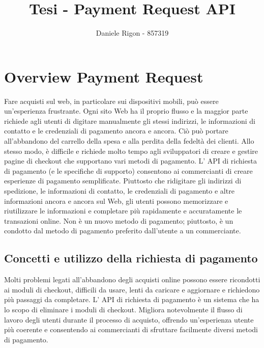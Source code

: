 \documentclass[italian]{article}
\author{
	Daniele Rigon - 857319 \\
}
\begin{document}
	
	\title{Tesi - Payment Request API}
	\maketitle
	
	\tableofcontents
	\pagebreak
	
	\section{Overview Payment Request}
	Fare acquisti sul web, in particolare sui dispositivi mobili, può essere un'esperienza frustrante. Ogni sito Web ha il proprio flusso e la maggior parte richiede agli utenti di digitare manualmente gli stessi indirizzi, le informazioni di contatto e le credenziali di pagamento ancora e ancora. Ciò può portare all'abbandono del carrello della spesa e alla perdita della fedeltà dei clienti. Allo stesso modo, è difficile e richiede molto tempo agli sviluppatori di creare e gestire pagine di checkout che supportano vari metodi di pagamento.
	L' API di richiesta di pagamento (e le specifiche di supporto) consentono ai commercianti di creare esperienze di pagamento semplificate. Piuttosto che ridigitare gli indirizzi di spedizione, le informazioni di contatto, le credenziali di pagamento e altre informazioni ancora e ancora sul Web, gli utenti possono memorizzare e riutilizzare le informazioni e completare più rapidamente e accuratamente le transazioni online. Non è un nuovo metodo di pagamento; piuttosto, è un condotto dal metodo di pagamento preferito dall'utente a un commerciante.
	
	\subsection{Concetti e utilizzo della richiesta di pagamento}
	
	Molti problemi legati all'abbandono degli acquisti online possono essere ricondotti ai moduli di checkout, difficili da usare, lenti da caricare e aggiornare e richiedono più passaggi da completare. L' API di richiesta di pagamento è un sistema che ha lo scopo di eliminare i moduli di checkout. Migliora notevolmente il flusso di lavoro degli utenti durante il processo di acquisto, offrendo un'esperienza utente più coerente e consentendo ai commercianti di sfruttare facilmente diversi metodi di pagamento. 
	
\end{document}

